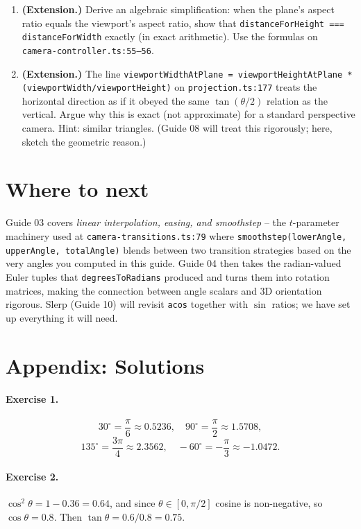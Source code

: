 \documentclass{article}
\begin{document}
\begin{enumerate}
  \item \textbf{(Extension.)} Derive an algebraic simplification: when the
    plane's aspect ratio equals the viewport's aspect ratio, show that
    \lstinline{distanceForHeight === distanceForWidth} exactly (in exact
    arithmetic). Use the formulas on \texttt{camera-controller.ts:55--56}.

  \item \textbf{(Extension.)} The line
    \lstinline{viewportWidthAtPlane = viewportHeightAtPlane * (viewportWidth/viewportHeight)}
    on \texttt{projection.ts:177} treats the horizontal direction as if it
    obeyed the same $\tan(\theta/2)$ relation as the vertical. Argue why this
    is exact (not approximate) for a standard perspective camera. Hint:
    similar triangles. (Guide 08 will treat this rigorously; here, sketch the
    geometric reason.)
\end{enumerate}

\section{Where to next}

Guide 03 covers \emph{linear interpolation, easing, and smoothstep} -- the
$t$-parameter machinery used at \texttt{camera-transitions.ts:79} where
\lstinline{smoothstep(lowerAngle, upperAngle, totalAngle)} blends between two
transition strategies based on the very angles you computed in this guide.
Guide 04 then takes the radian-valued Euler tuples that
\lstinline{degreesToRadians} produced and turns them into rotation matrices,
making the connection between angle scalars and 3D orientation rigorous.
Slerp (Guide 10) will revisit \lstinline{acos} together with $\sin$ ratios; we
have set up everything it will need.

\appendix
\section*{Appendix: Solutions}

\paragraph{Exercise 1.}
\[
  30^\circ = \frac{\pi}{6} \approx 0.5236, \quad
  90^\circ = \frac{\pi}{2} \approx 1.5708,
\]
\[
  135^\circ = \frac{3\pi}{4} \approx 2.3562, \quad
  -60^\circ = -\frac{\pi}{3} \approx -1.0472.
\]

\paragraph{Exercise 2.}
$\cos^2\theta = 1 - 0.36 = 0.64$, and since $\theta \in [0, \pi/2]$ cosine is
non-negative, so $\cos\theta = 0.8$. Then
$\tan\theta = 0.6/0.8 = 0.75$.
\end{document}
